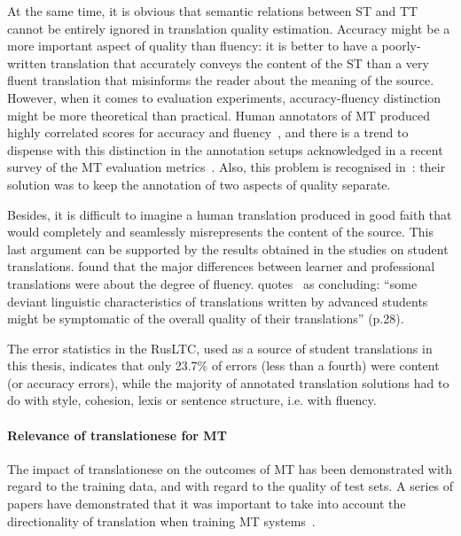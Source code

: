 At the same time, it is obvious that semantic relations between ST and TT cannot be entirely ignored in translation quality estimation. Accuracy might be a more important aspect of quality than fluency: it is better to have a poorly-written translation that accurately conveys the content of the ST than a very fluent translation that misinforms the reader about the meaning of the source. 
However, when it comes to evaluation experiments, accuracy-fluency distinction might be more theoretical than practical. Human annotators of MT produced highly correlated scores for accuracy and fluency~\cite{CallisonBurch2007}, and there is a trend to dispense with this distinction in the annotation setups acknowledged in a recent survey of the MT evaluation metrics~\cite{Chatzikoumi2020}. Also, this problem is recognised in~\citet{Daems2017}: their solution was to keep the annotation of two aspects of quality separate.

Besides, it is difficult to imagine a human translation produced in good faith that would completely and seamlessly misrepresents the content of the source. This last argument can be supported by the results obtained in the studies on student translations. \citet{Carl2010} found that the major differences between learner and professional translations were about the degree of fluency. \citet{Sutter2017} quotes~\citet{Loock2016} as concluding: ``some deviant linguistic characteristics of translations written by advanced students might be symptomatic of the overall quality of their translations'' (p.28). 

The error statistics in the \gls{RusLTC}, used as a source of student translations in this thesis, indicates that only 23.7\% of errors (less than a fourth) were content (or accuracy errors), while the majority of annotated translation solutions had to do with style, cohesion, lexis or sentence structure, i.e. with fluency. 
\paragraph{Relevance of translationese for MT} The impact of translationese on the outcomes of MT has been demonstrated with regard to the training data, and with regard to the quality of test sets. 
A series of papers have demonstrated that it was important to take into account the directionality of translation when training MT systems~\cite{Kurokawa2009,Lembersky2012,Lembersky2013,Stymne2017}.

